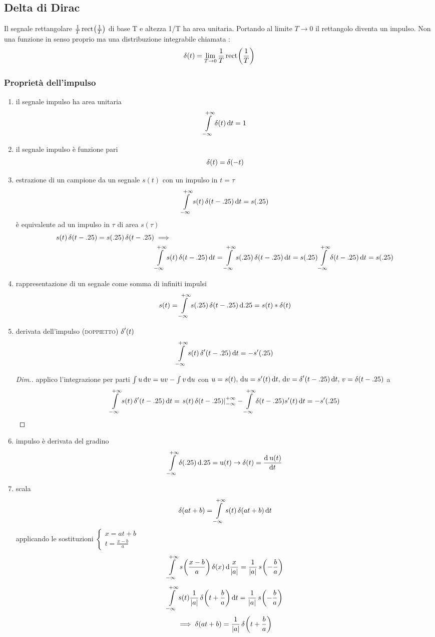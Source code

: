 \subsection{Delta di Dirac}
Il segnale rettangolare $\frac{1}{T} \rect{\frac{1}{T}}$ di base T e altezza 1/T ha area unitaria. Portando al limite $T\to 0$ il rettangolo diventa un impulso. Non una funzione in senso proprio ma una distribuzione integrabile chiamata : \[\delta(t)=\lim\limits_{T\to 0}\frac{1}{T}\rect{\frac{1}{T}}\]

\subsubsection{Proprietà dell'impulso}
\begin{enumerate}
\item il segnale impulso ha area unitaria \[ \intinf{\impulse(t)}{t}=1 \]
\item il segnale impulso è funzione pari \[ \impulse(t)=\impulse(-t) \]
\item estrazione di un campione da un segnale $s(t)$ con un impulso in $t=\tau$ \[ \intinf{s(t)\impulse(t-\tau)}{t}=s(\tau) \]
è equivalente ad un impulso in $\tau$ di area $s(\tau)$
\begin{align*}
 s(t)\impulse(t-\tau)=s(\tau)\impulse(t-\tau) &\implies \\ & \intinf{s(t)\impulse(t-\tau)}{t} =\intinf{s(\tau)\impulse(t-\tau)}{t} = s(\tau)\intinf{\impulse(t-\tau)}{t} = s(\tau)
 \end{align*}

\item rappresentazione di un segnale come somma di infiniti impulsi
\[s(t)=\intinf{s(\tau)\impulse(t-\tau)}{\tau}=s(t)\ast\impulse(t)\]
\item derivata dell'impulso (\textsc{doppietto}) $\impulse'(t)$
\[ \intinf{s(t)\impulse'(t-\tau)}{t}=-s'(\tau) \]
\begin{proof}[Dim.]
applico l'integrazione per parti $\int{u \diff v}=u v-\int{v\diff u}$ con $u=s(t) ,\, \diff u=s'(t)\diff t ,\, \diff v=\impulse'(t-\tau)\diff t ,\, v=\impulse(t-\tau)$  a
\[\intinf{s(t)\impulse'(t-\tau)}{t}= \restrict{s(t)\impulse(t-\tau)}{-\infty}^{+\infty} -\intinf{\impulse(t-\tau)s'(t)}{t}=-s'(\tau)  \]
\end{proof}
\item impulso è derivata del gradino
\[\intinf{\impulse(\tau)}{\tau}=\step(t)  \to \impulse(t)=\deriv{\step(t)}{t} \]
\item scala
\[\impulse(a t+b)=\intinf{s(t)\impulse(a t+b)}{t}\]
applicando le sostituzioni $\begin{cases}x=a t+b \\ t=\frac{x-b}{a}\end{cases}$
\[\intinf{\f{s}{\frac{x-b}{a}}\impulse(x)}{\frac{x}{\abs{a}}}=\frac{1}{\abs{a}}\f{s}{-\frac{b}{a}}\]
\[\intinf{s(t)\frac{1}{\abs{a}}\f{\impulse}{t+\frac{b}{a}}}{t}=\frac{1}{\abs{a}}\f{s}{-\frac{b}{a}}\]
\[\implies\impulse(a t+b)=\frac{1}{\abs{a}}\f{\impulse}{t+\frac{b}{a}} \]

\end{enumerate}

